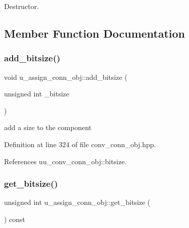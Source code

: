 Destructor. 



\subsection{Member Function Documentation}
\mbox{\label{classu__assign__conn__obj_a2a96325e12d7b2ce296b7fd4ee6dfea3}} 
\subsubsection{\texorpdfstring{add\+\_\+bitsize()}{add\_bitsize()}}
{\footnotesize\ttfamily void u\+\_\+assign\+\_\+conn\+\_\+obj\+::add\+\_\+bitsize (\begin{DoxyParamCaption}\item[{unsigned int}]{\+\_\+bitsize }\end{DoxyParamCaption})\hspace{0.3cm}{\ttfamily [inline]}}



add a size to the component 



Definition at line 324 of file conv\+\_\+conn\+\_\+obj.\+hpp.



References uu\+\_\+conv\+\_\+conn\+\_\+obj\+::bitsize.

\mbox{\label{classu__assign__conn__obj_a4039600989d2c814004ebc6114f855ea}} 
\subsubsection{\texorpdfstring{get\+\_\+bitsize()}{get\_bitsize()}}
{\footnotesize\ttfamily unsigned int u\+\_\+assign\+\_\+conn\+\_\+obj\+::get\+\_\+bitsize (\begin{DoxyParamCaption}{ }\end{DoxyParamCaption}) const\hspace{0.3cm}{\ttfamily [inline]}}



